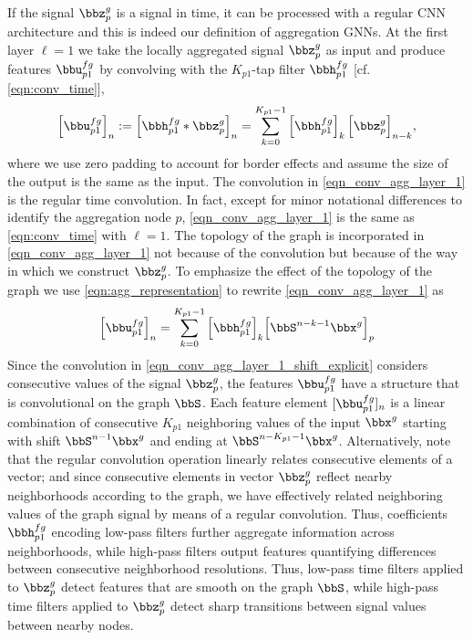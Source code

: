 If the signal $\bbz_p^g$ is a signal in time, it can be processed with a regular CNN architecture and this is indeed our definition of aggregation GNNs. At the first layer $\ell=1$ we take the locally aggregated signal $\bbz_p^g$ as input and produce features $\bbu_{p1}^{fg}$ by convolving with the $K_{p1}$-tap filter $\bbh_{p1}^{fg}$ [cf. \eqref{eqn:conv_time}],
% 
\begin{align}\label{eqn_conv_agg_layer_1}
   \Big[\bbu_{p1}^{fg}\Big]_n 
       :=   \Big[\bbh_{p1}^{fg} \ast \bbz_p^g\Big]_{n}  
	    =   \sum_{k=0}^{K_{p1}-1}  \Big[ \bbh_{p1}^{fg}  \Big]_{k}  \,
	        \Big[ \bbz_p^g \Big]_{n-k} ,
\end{align}
%
where we use zero padding to account for border effects and assume the size of the output is the same as the input. The convolution in \eqref{eqn_conv_agg_layer_1} is the regular time convolution. In fact, except for minor notational differences to identify the aggregation node $p$, \eqref{eqn_conv_agg_layer_1} is the same as \eqref{eqn:conv_time} with $\ell=1$. The topology of the graph is incorporated in \eqref{eqn_conv_agg_layer_1} not because of the convolution but because of the way in which we construct $\bbz_p^g$. To emphasize the effect of the topology of the graph we use \eqref{eqn:agg_representation} to rewrite \eqref{eqn_conv_agg_layer_1} as
%
\begin{equation} \label{eqn_conv_agg_layer_1_shift_explicit}
   \Big[\bbu_{p1}^{fg}\Big]_n 
       = \sum_{k=0}^{K_{p1}-1} 
              \Big[ \bbh_{p1}^{fg}     \Big]_{k} 
              \Big[ \bbS^{n-k-1}\bbx^g \Big]_{p}
\end{equation}
%
Since the convolution in \eqref{eqn_conv_agg_layer_1_shift_explicit} considers consecutive values of the signal $\bbz_p^{g}$, the features $\bbu_{p1}^{fg}$ have a structure that is convolutional on the graph $\bbS$. Each feature element $[\bbu_{p1}^{fg}]_{n}$ is a linear combination of consecutive $K_{p1}$ neighboring values of the input $\bbx^{g}$ starting with shift $\bbS^{n-1}\bbx^{g}$ and ending at $\bbS^{n-K_{p1}-1}\bbx^{g}$. Alternatively, note that the regular convolution operation linearly relates consecutive elements of a vector; and since consecutive elements in vector $\bbz_{p}^{g}$ reflect nearby neighborhoods according to the graph, we have effectively related neighboring values of the graph signal by means of a regular convolution. Thus, coefficients $\bbh_{p1}^{fg}$ encoding low-pass filters further aggregate information across neighborhoods, while high-pass filters output features quantifying differences between consecutive neighborhood resolutions. Thus, low-pass time filters applied to $\bbz_p^{g}$ detect features that are smooth on the graph $\bbS$, while high-pass time filters applied to $\bbz_p^{g}$ detect sharp transitions between signal values between nearby nodes.

